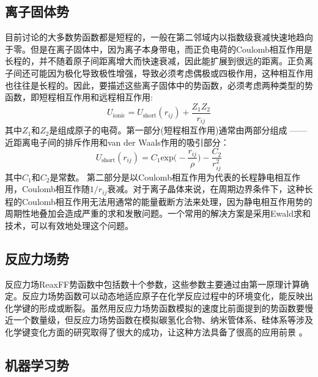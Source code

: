 \subsection{离子固体势}
目前讨论的大多数势函数都是短程的，一般在第二邻域内以指数级衰减快速地趋向于零。但是在离子固体中，因为离子本身带电，而正负电荷的\textrm{Coulomb}相互作用是长程的，并不随着原子间距离增大而快速衰减，因此能扩展到很远的距离。正负离子间还可能因为极化导致极性增强，导致必须考虑偶极或四极作用，这种相互作用也往往是长程的。因此，要描述这些离子固体中的势函数，必须考虑两种类型的势函数，即短程相互作用和远程相互作用:
\begin{equation}
	U_{\mathrm{ionic}}=U_{\mathrm{short}}(r_{ij})+\dfrac{Z_1Z_2}{r_{ij}}
	\label{eq:Potential_ionic}
\end{equation}
其中$Z_1$和$Z_2$是组成原子的电荷。第一部分(短程相互作用)通常由两部分组成 ——近距离电子间的排斥作用和\textrm{van der Waals}作用的吸引部分：
\begin{equation}
	U_{\mathrm{short}}(r_{ij})=C_1\mathrm{exp}\bigg(-\dfrac{r_{ij}}{\rho}\bigg)-\dfrac{C_2}{r_{ij}^2}
	\label{eq:Potential_ionic_vdW}
\end{equation}
其中$C_1$和$C_2$是常数。
第二部分是以\textrm{Coulomb}相互作用为代表的长程静电相互作用，\textrm{Coulomb}相互作随$1/r_{ij}$衰减。对于离子晶体来说，在周期边界条件下，这种长程的\textrm{Coulomb}相互作用无法用通常的能量截断方法来处理，因为静电相互作用势的周期性地叠加会造成严重的求和发散问题。一个常用的解决方案是采用\textrm{Ewald}求和技术\cite{AP369-253_1921}，可以有效地处理这个问题。%
\subsection{反应力场势}
反应力场\textrm{ReaxFF}势函数\cite{JPCA105-9396_2001}中包括数十个参数，这些参数主要通过由第一原理计算确定。反应力场势函数可以动态地适应原子在化学反应过程中的环境变化，能反映出化学键的形成或断裂。虽然用反应力场势函数模拟的速度比前面提到的势函数要慢近一个数量级，但反应力场势函数在模拟碳氢化合物、纳米管体系、硅体系等涉及化学键变化方面的研究取得了很大的成功，让这种方法具备了很高的应用前景
。


\subsection{机器学习势}
%
%

